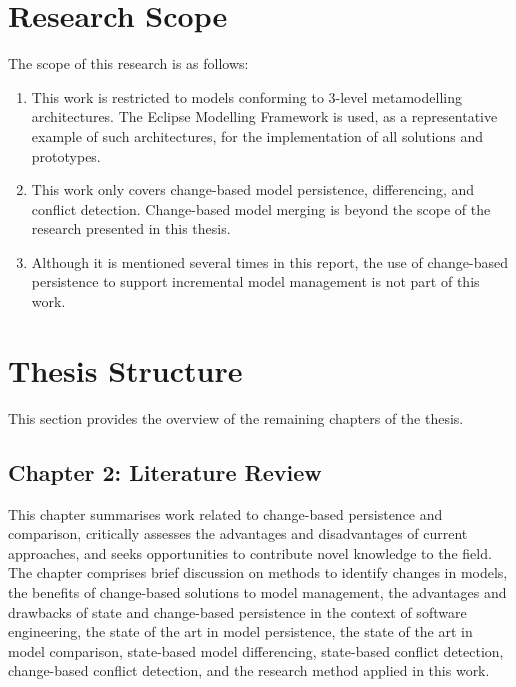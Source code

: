 \section{Research Scope}
\label{sec:research_scope}
The scope of this research is as follows:
\begin{enumerate}
\item This work is restricted to models conforming to 3-level metamodelling architectures. The Eclipse Modelling Framework is used, as a representative example of such architectures, for the implementation of all solutions and prototypes.
\item This work only covers change-based model persistence, differencing, and conflict detection. Change-based model merging is beyond the scope of the research presented in this thesis.
\item Although it is mentioned several times in this report, the use of change-based persistence to support incremental model management is not part of this work. 
\end{enumerate}

\section{Thesis Structure}
\label{sec:Thesis Structure}
This section provides the overview of the remaining chapters of the thesis.


\subsection{Chapter 2: Literature Review}
\label{sec:chapter_2_literature_review_plan}
This chapter summarises work related to change-based persistence and comparison, critically assesses the advantages and disadvantages of current approaches, and seeks opportunities to contribute novel knowledge to the field. The chapter comprises brief discussion on methods to identify changes in models, the benefits of change-based solutions to model management, the advantages and drawbacks of state and change-based persistence in the context of software engineering, the state of the art in model persistence, the state of the art in model comparison, state-based model differencing, state-based conflict detection, change-based conflict detection, and the research method applied in this work.

